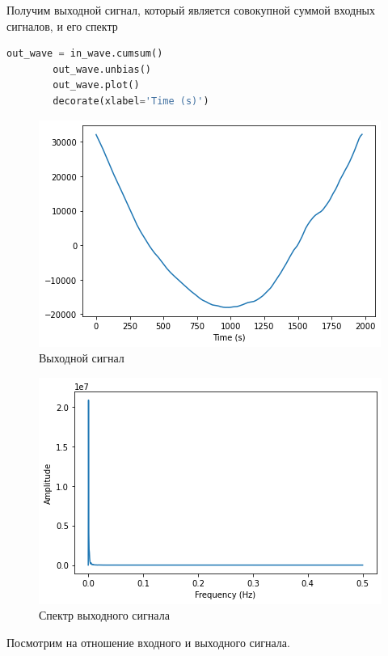 \documentclass[a4paper, 14pt]{extarticle}
\begin{document}
    Получим выходной сигнал, который является совокупной суммой входных сигналов, и его спектр

    \begin{lstlisting}[language=Python, caption= Создание сигнала facebook, label={lst:make_signal_fb}]
        out_wave = in_wave.cumsum()
        out_wave.unbias()
        out_wave.plot()
        decorate(xlabel='Time (s)')
    \end{lstlisting}

    \begin{figure}[H]
        \centering
        \includegraphics[width=0.8\linewidth]{signal_cumsum}
        \caption{Выходной сигнал}
        \label{fig:signal_cumsum}
    \end{figure}

    \begin{figure}[H]
        \centering
        \includegraphics[width=0.8\linewidth]{signal_cumsum_spectrum}
        \caption{Спектр выходного сигнала}
        \label{fig:signal_cumsum_spectrum}
    \end{figure}

    Посмотрим на отношение входного и выходного сигнала.
\end{document}
